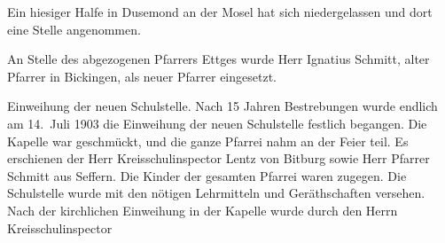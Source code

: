 

Ein hiesiger Halfe in Dusemond an der\ob
Mosel hat sich niedergelassen und dort eine\ob
Stelle angenommen.

\pend
{}
\pstart

An Stelle des abgezogenen Pfarrers Ettges\ob
wurde Herr Ignatius Schmitt, alter Pfarrer\ob
in Bickingen, als neuer Pfarrer eingesetzt.

%
        Einweihung der neuen Schulstelle.\ob
Nach 15 Jahren Bestrebungen wurde endlich\ob
am 14.\ Juli 1903 die Einweihung der neuen\ob
Schulstelle festlich begangen. Die Kapelle\ob
war geschmückt, und die ganze Pfarrei nahm\ob
an der Feier teil. Es erschienen der Herr\ob
Kreisschulinspector Lentz von Bitburg\ob
sowie Herr Pfarrer Schmitt aus Seffern.\ob
Die Kinder der gesamten Pfarrei waren\ob
zugegen. Die Schulstelle wurde mit den\ob
nötigen Lehrmitteln und Geräthschaften\ob
versehen. Nach der kirchlichen Einweihung\ob
in der Kapelle wurde durch den Herrn\ob
Kreisschulinspector
\pend
